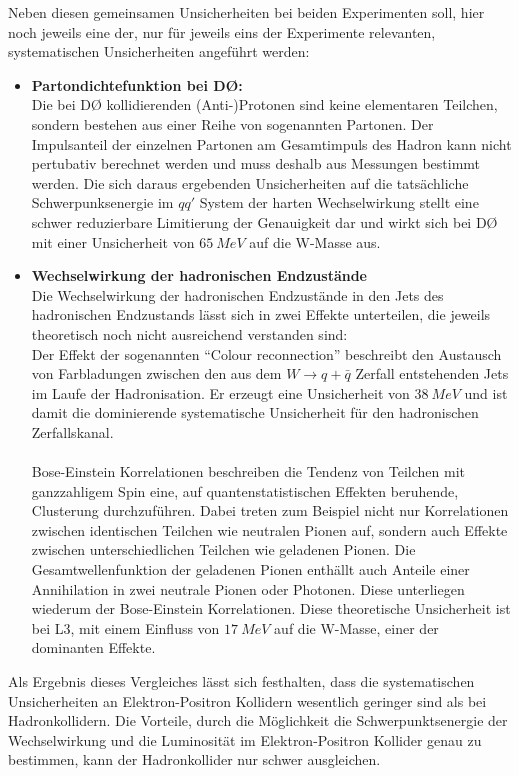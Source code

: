 \documentclass[a4paper,12pt]{article}
\begin{document}
Neben diesen gemeinsamen Unsicherheiten bei beiden Experimenten soll, hier noch jeweils eine der, nur für jeweils eins der Experimente relevanten,
systematischen Unsicherheiten angeführt werden:
\begin{itemize}
	\item \textbf{Partondichtefunktion bei DØ:}\\
	Die bei DØ kollidierenden (Anti-)Protonen sind keine elementaren Teilchen, sondern bestehen aus einer Reihe von sogenannten Partonen. Der
	Impulsanteil der einzelnen Partonen am Gesamtimpuls des Hadron kann nicht pertubativ berechnet werden und muss deshalb aus Messungen bestimmt
	werden. Die sich daraus ergebenden Unsicherheiten auf die tatsächliche Schwerpunksenergie im $qq'$ System der harten Wechselwirkung stellt eine
	schwer reduzierbare Limitierung der Genauigkeit dar und wirkt sich bei DØ mit einer Unsicherheit von $\SI{65}{MeV}$ auf die W-Masse aus.
	\item \textbf{Wechselwirkung der hadronischen Endzustände}\\
	Die Wechselwirkung der hadronischen Endzustände in den Jets des hadronischen Endzustands lässt sich in zwei Effekte unterteilen, die jeweils
	theoretisch noch nicht ausreichend verstanden sind: \\
	Der Effekt der sogenannten "`Colour reconnection"' beschreibt den Austausch von Farbladungen zwischen
	den aus dem $W\rightarrow q+\bar{q}$ Zerfall entstehenden Jets im Laufe der Hadronisation. Er erzeugt eine Unsicherheit von $\SI{38}{MeV}$
	und ist damit die dominierende systematische Unsicherheit für den hadronischen Zerfallskanal.\\
	\\
	Bose-Einstein Korrelationen beschreiben die Tendenz von Teilchen mit ganzzahligem Spin eine, auf quantenstatistischen Effekten beruhende, Clusterung
	durchzuführen. Dabei treten zum Beispiel nicht nur Korrelationen zwischen identischen Teilchen wie neutralen Pionen auf, sondern auch Effekte zwischen
	unterschiedlichen Teilchen wie geladenen Pionen. Die Gesamtwellenfunktion der geladenen Pionen enthällt auch Anteile einer Annihilation in
	zwei neutrale Pionen oder Photonen. Diese unterliegen	wiederum der Bose-Einstein Korrelationen.
	 Diese theoretische Unsicherheit ist bei L3, mit einem Einfluss von $\SI{17}{MeV}$ auf die W-Masse,
	einer der dominanten Effekte.
\end{itemize}
Als Ergebnis dieses Vergleiches lässt sich festhalten, dass die systematischen Unsicherheiten an Elektron-Positron Kollidern wesentlich geringer sind als
bei Hadronkollidern. Die Vorteile, durch die Möglichkeit die Schwerpunktsenergie der Wechselwirkung und die Luminosität im Elektron-Positron Kollider genau zu bestimmen, kann der Hadronkollider nur schwer ausgleichen.
\end{document}
